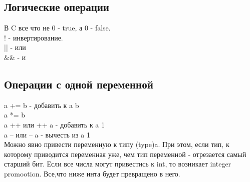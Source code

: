 \documentclass[a4paper,12pt]{article}
\begin{document}
\subsection{Логические операции}
В C все что не 0 - true, а 0 - false. \\
! - инвертирование.\\
|| - или\\
$\& \&$ - и\\
\subsection{Операции с одной переменной}
a += b - добавить к a b\\
a *= b\\ 
a ++ или ++ a - добавить к a 1\\
a -- или -- a - вычесть из a 1\\
Можно явно привести переменную к типу (type)a. При этом, если тип, к которому приводится переменная уже, чем тип переменной - отрезается самый старший бит.
Если все числа могут привестись к int, то возникает integer promootion. Все,что ниже инта будет превращено в него.
\end{document}
